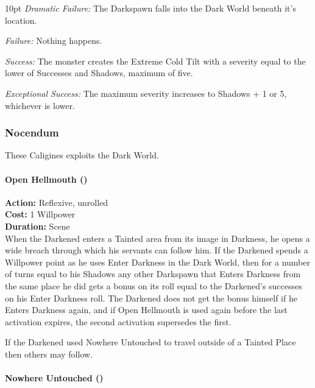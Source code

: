 \begin{myindentpar}{10pt} \emph{Dramatic Failure:} The Darkspawn falls into the Dark World beneath it's location. 

    \emph{Failure:} Nothing happens. 

    \emph{Success:} The monster creates the Extreme Cold Tilt with a severity equal to the lower of Successes and Shadows, maximum of five. 

    \emph{Exceptional Success:} The maximum severity increases to Shadows + 1 or 5, whichever is lower.

    \end{myindentpar}

\subsubsection*{Nocendum}

These Caligines exploits the Dark World.  \\

\paragraph*{Open Hellmouth (\textbullet)} 

\noindent \textbf{Action:} Reflexive, unrolled \\

\noindent \textbf{Cost:} 1 Willpower \\

\noindent \textbf{Duration:} Scene \\

When the Darkened enters a Tainted area from its image in Darkness, he opens a wide breach through which his servants can follow him. If the Darkened spends a Willpower point as he uses Enter Darkness in the Dark World, then for a number of turns equal to his Shadows any other Darkspawn that Enters Darkness from the same place he did gets a bonus on its roll equal to the Darkened's successes on his Enter Darkness roll. The Darkened does not get the bonus himself if he Enters Darkness again, and if Open Hellmouth is used again before the last activation expires, the second activation supersedes the first.

If the Darkened used Nowhere Untouched to travel outside of a Tainted Place then others may follow.

\paragraph*{Nowhere Untouched (\textbullet\textbullet)} 

